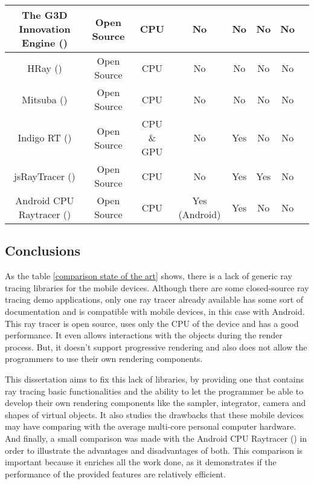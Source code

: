 \begin{table}[H]
\begin{tabular}{|c|c|c|c|c|c|c|c|}
The G3D Innovation Engine (\cite{G3D17})						& Open Source	& CPU 				& No				& No                 		& No                 		& No\\ \hline
HRay (\cite{HRay})										& Open Source     	& CPU                		& No                  		& No                      	& No				& No\\ \hline
Mitsuba (\cite{Mitsuba})										& Open Source 	& CPU 				& No				& No                 		& No				& No\\ \hline
Indigo RT (\cite{IndigoRT})									& Open Source 	& CPU \& GPU		& No				& Yes                 		& No				& No\\ \hline
jsRayTracer (\cite{jsRayTracer})								& Open Source 	& CPU 				& No				& Yes                 		& Yes				& No\\ \hline
Android CPU Raytracer (\cite{Android_CPU_Raytracer})			& Open Source 	& CPU 				& Yes (Android)		& Yes                 		& No				& No\\ \hline
\end{tabular}
\normalsize
\end{table}

\subsection{Conclusions}


\par
As the table \ref{comparison state of the art} shows, there is a lack of generic ray tracing libraries for the mobile devices.
Although there are some closed-source ray tracing demo applications, only one ray tracer already available has some sort of documentation and is compatible with mobile devices, in this case with Android.
This ray tracer is open source, uses only the CPU of the device and has a good performance.
It even allows interactions with the objects during the render process.
But, it doesn’t support progressive rendering and also does not allow the programmers to use their own rendering components.

\par
This dissertation aims to fix this lack of libraries, by providing one that contains ray tracing basic functionalities and the ability to let the programmer be able to develop their own rendering components like the sampler, integrator, camera and shapes of virtual objects.
It also studies the drawbacks that these mobile devices may have comparing with the average multi-core personal computer hardware.
And finally, a small comparison was made with the Android CPU Raytracer (\cite{Android_CPU_Raytracer}) in order to illustrate the advantages and disadvantages of both.
This comparison is important because it enriches all the work done, as it demonstrates if the performance of the provided features are relatively efficient.